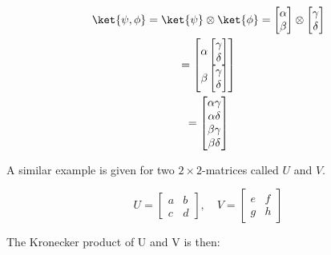 \documentclass[../main.tex]{subfiles}
\begin{document}
\begin{gather*}
    \ket{\psi, \phi} = \ket{\psi} \otimes \ket{\phi} = \begin{bmatrix} \alpha \\ \beta \end{bmatrix} \otimes \begin{bmatrix} \gamma \\ \delta \end{bmatrix} \\
    = \begin{bmatrix} \alpha \begin{bmatrix} \gamma \\ \delta \end{bmatrix} \\ \beta \begin{bmatrix} \gamma \\ \delta \end{bmatrix} \end{bmatrix} \\
    = \begin{bmatrix} \alpha \gamma \\ \alpha \delta \\ \beta \gamma \\ \beta \delta \end{bmatrix}
    \label{eq: kronecker_vector}
\end{gather*}

A similar example is given for two $2 \times 2$-matrices called $U$ and $V$.

\begin{equation*}
    U = \begin{bmatrix} a & b \\ c & d  \end{bmatrix}, \quad  V = \begin{bmatrix} e & f \\ g & h  \end{bmatrix}
    \label{eq: kronecker_matrix_definition}
\end{equation*}

The Kronecker product of U and V is then:
\end{document}
